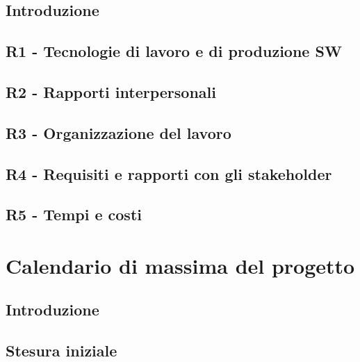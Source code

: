 \documentclass[a4paper,12pt]{article}
\begin{document}
    \subsection{Introduzione}
    \subsection{R1 - Tecnologie di lavoro e di produzione SW}      
    \subsection{R2 - Rapporti interpersonali}       
    \subsection{R3 - Organizzazione del lavoro}
    \subsection{R4 - Requisiti e rapporti con gli stakeholder}
    \subsection{R5 - Tempi e costi}

\newpage
\section{Calendario di massima del progetto}
    \subsection{Introduzione}
    \subsection{Stesura iniziale}

\end{document}
